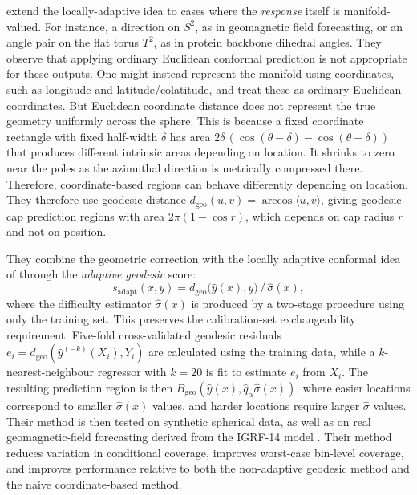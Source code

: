 \documentclass[11pt,a4paper]{report}
\newcommand{\dgeo}{d_{\mathrm{geo}}}
\begin{document}
\citet{amirishahbazi2026} extend the locally-adaptive idea to cases where the \emph{response} itself is manifold-valued. For instance, a direction on $S^2$, as in geomagnetic field forecasting, or an angle pair on the flat torus $T^2$, as in protein backbone dihedral angles. They observe that applying ordinary Euclidean conformal prediction is not appropriate for these outputs. One might instead represent the manifold using coordinates, such as longitude and latitude/colatitude, and treat these as ordinary Euclidean coordinates. But Euclidean coordinate distance does not represent the true geometry uniformly across the sphere. This is because a fixed coordinate rectangle with fixed half-width $\delta$ has area $2\delta\,(\cos(\theta-\delta) - \cos(\theta+\delta))$ that produces different intrinsic areas depending on location. It shrinks to zero near the poles as the azimuthal direction is metrically compressed there. Therefore, coordinate-based regions can behave differently depending on location. They therefore use geodesic distance $\dgeo(u,v) = \arccos\langle u,v\rangle$, giving geodesic-cap prediction regions with area $2\pi(1-\cos r)$, which depends on cap radius $r$ and not on position.

They combine the geometric correction with the locally adaptive conformal idea of \citet{lei2018,romano2019} through the \emph{adaptive geodesic} score:
\begin{equation}
    s_{\mathrm{adapt}}(x,y) = \dgeo\big(\hat y(x), y\big) \,/\, \hat\sigma(x),
    \label{eq:paper-score}
\end{equation}
where the difficulty estimator $\hat\sigma(x)$ is produced by a two-stage procedure using only the training set. This preserves the calibration-set exchangeability requirement. Five-fold cross-validated geodesic residuals $e_i = \dgeo(\hat y^{(-k)}(X_i), Y_i)$ are calculated using the training data, while a $k$-nearest-neighbour regressor with $k=20$ is fit to estimate $e_i$ from $X_i$.  The resulting prediction region is then $B_{\mathrm{geo}}(\hat y(x), \hat q_\alpha \hat\sigma(x))$, where easier locations correspond to smaller $\hat{\sigma}(x)$ values, and harder locations require larger $\hat{\sigma}$ values. Their method is then tested on synthetic spherical data, as well as on real geomagnetic-field forecasting derived from the IGRF-14 model \citep{alken2021}. Their method reduces variation in conditional coverage, improves worst-case bin-level coverage, and improves performance relative to both the non-adaptive geodesic method and the naive coordinate-based method.
 
\end{document}
